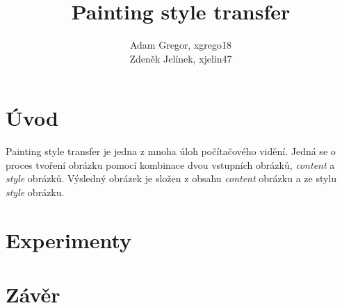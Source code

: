 \documentclass[twocolumn]{article}
\title{\Huge Painting style transfer}
\author{Adam Gregor, xgrego18 \\
		Zdeněk Jelínek, xjelin47
}
\begin{document}
\maketitle

\section*{Úvod}
Painting style transfer je jedna z mnoha úloh počítačového vidění. Jedná se o proces tvoření obrázku pomocí kombinace dvou vstupních obrázků, \textit{content} a \textit{style} obrázků. Výsledný obrázek je složen z obsahu \textit{content} obrázku a ze stylu \textit{style} obrázku. \par



\section*{Experimenty}
\lipsum
\section*{Závěr}
\lipsum
\end{document}
